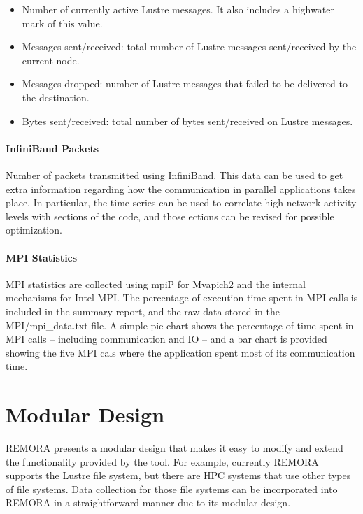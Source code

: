 \documentclass[10pt,a4paper]{report}
\begin{document}
\begin{itemize}
\item Number of currently active Lustre messages. It also includes a highwater mark of this value.
\item Messages sent/received: total number of Lustre messages sent/received by the current node.
\item Messages dropped: number of Lustre messages that failed to be delivered to the destination.
\item Bytes sent/received: total number of bytes sent/received on Lustre messages.
\end{itemize}


\paragraph{InfiniBand Packets}
Number of packets transmitted using InfiniBand. This data can be used to get extra information regarding how the communication in parallel applications takes place. In particular, the time series can be used to correlate high network activity levels with sections of the code, and those ections can be revised for possible optimization.

\paragraph{MPI Statistics}
MPI statistics are collected using mpiP for Mvapich2 and the internal mechanisms for Intel MPI. The percentage of execution time spent in MPI calls is included in the summary report, and the raw data stored in the MPI/mpi\_data.txt file. A simple pie chart shows the percentage of time spent in MPI calls -- including communication and IO -- and a bar chart is provided showing the five MPI cals where the application spent most of its communication time.

\FloatBarrier
\section{Modular Design}
REMORA presents a modular design that makes it easy to modify and extend the functionality 
provided by the tool. For example, currently REMORA supports
the Lustre file system, but there are HPC systems that use other types of file systems.
Data collection for those file systems can be incorporated into REMORA in a straightforward
manner due to its modular design.
\end{document}
